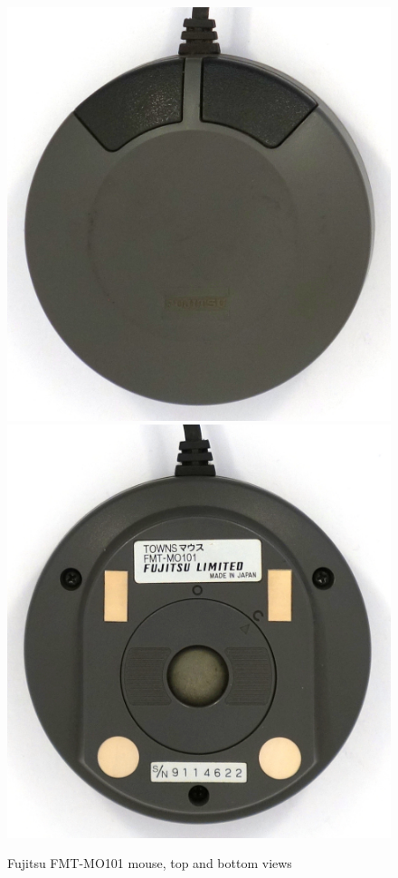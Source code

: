 \documentclass[11pt, a4paper]{article}
\begin{document}
\begin{figure}[h]
    \centering
    \includegraphics[scale=0.55]{1989_fujitsu_fmt_mo101_mouse/top_30.jpg}
    \includegraphics[scale=0.55]{1989_fujitsu_fmt_mo101_mouse/bottom_30.jpg}
    \caption{Fujitsu FMT-MO101 mouse, top and bottom views}
    \label{fig:FMT1TopAndBottom}
\end{figure}
\end{document}
